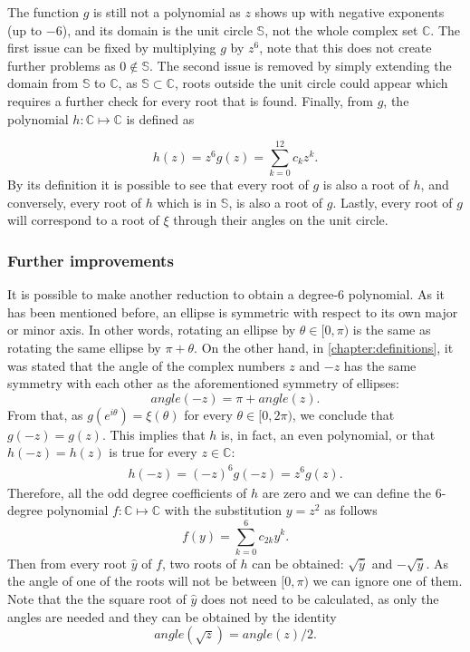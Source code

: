 The function $g$ is still not a polynomial as $z$ shows up with negative exponents (up to $-6$), and its domain is the unit circle $\mathbb{S}$, not the whole complex set $\mathbb{C}$. 
The first issue can be fixed by multiplying $g$ by $z^6$, note that this does not create further problems as $0\not\in \mathbb{S}$. The second issue is removed by simply extending the domain from $\mathbb{S}$ to $\mathbb{C}$, as $\mathbb{S} \subset \mathbb{C}$, roots outside the unit circle could appear which requires a further check for every root that is found.
Finally, from $g$, the polynomial $h : \mathbb{C} \mapsto \mathbb{C}$ is defined as

\begin{equation}\label{eq:h}
h(z) = z^6 g(z) = \sum_{k=0}^{12} c_k z^k.
\end{equation}
By its definition it is possible to see that every root of $g$ is also a root of $h$, and conversely, every root of $h$ which is in $\mathbb{S}$, is also a root of $g$. Lastly, every root of $g$ will correspond to a root of $\xi$ through their angles on the unit circle.

\subsubsection{Further improvements}

It is possible to make another reduction to obtain a degree-$6$ polynomial.
As it has been mentioned before, an ellipse is symmetric with respect to its own major or minor axis. 
In other words, rotating an ellipse by $\theta \in [0, \pi)$ is the same as rotating the same ellipse by $\pi + \theta$.
On the other hand, in \autoref{chapter:definitions}, it was stated that the angle of the complex numbers $z$ and $-z$ has the same symmetry with each other as the aforementioned symmetry of ellipses:
\begin{equation*}
angle(-z) = \pi + angle(z).
\end{equation*}
From that, as $g(e^{i\theta})=\xi(\theta)$ for every $\theta \in [0, 2\pi)$, we conclude that $g(-z)=g(z)$. This implies that $h$ is, in fact, an even polynomial, or that $h(-z) = h(z)$ is true for every $z\in\mathbb{C}$:
\begin{align}
h(-z) = (-z)^6g(-z) = z^6g(z).
\end{align}
Therefore, all the odd degree coefficients of $h$ are zero and we can define the $6$-degree polynomial $f : \mathbb{C} \mapsto \mathbb{C}$ with the substitution $y=z^2$ as follows
\begin{equation}
f(y) = \sum_{k=0}^{6} c_{2k} y^k.
\end{equation}
Then from every root $\hat{y}$ of $f$, two roots of $h$ can be obtained: $\sqrt{\hat{y}}$ and $-\sqrt{\hat{y}}$. As the angle of one of the roots will not be between $[0, \pi)$ we can ignore one of them. 
Note that the the square root of $\hat{y}$ does not need to be calculated, as only the angles are needed and they can be obtained by the identity
\begin{equation}
angle(\sqrt{z}) = angle(z)/2.
\end{equation}

